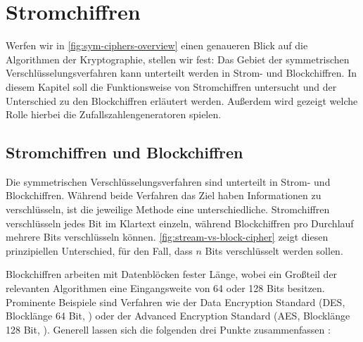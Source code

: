 \chapter{Stromchiffren}



\noindent
Werfen wir in \autoref{fig:sym-ciphers-overview} einen genaueren Blick auf die Algorithmen
der Kryptographie, stellen wir fest: Das Gebiet
der symmetrischen Verschlüsselungsverfahren kann unterteilt werden in Strom- und Blockchiffren.
In diesem Kapitel soll die Funktionsweise von Stromchiffren untersucht und der Unterschied zu
den Blockchiffren erläutert werden. Außerdem wird gezeigt welche
Rolle hierbei die Zufallszahlengeneratoren spielen.

\section{Stromchiffren und Blockchiffren}
Die symmetrischen Verschlüsselungsverfahren sind unterteilt in Strom- und Blockchiffren.
Während beide Verfahren das Ziel haben Informationen zu verschlüsseln, ist die jeweilige
Methode eine unterschiedliche. Stromchiffren verschlüsseln jedes Bit im Klartext einzeln,
während Blockchiffren pro Durchlauf mehrere Bits verschlüsseln können.
\autoref{fig:stream-vs-block-cipher} zeigt diesen prinzipiellen Unterschied, für den Fall, dass
$n$ Bits verschlüsselt werden sollen.



\noindent
Blockchiffren arbeiten mit Datenblöcken fester Länge, wobei ein Großteil der
relevanten Algorithmen eine Eingangsweite von 64 oder 128 Bits besitzen.
Prominente Beispiele sind Verfahren wie der Data Encryption Standard
(DES, Blocklänge 64 Bit, \cite[55-58]{BOOK:crypto}) oder der Advanced Encryption Standard
(AES, Blocklänge 128 Bit, \cite[87-90]{BOOK:crypto}).
Generell lassen sich die folgenden drei Punkte zusammenfassen \parencite[31]{BOOK:crypto}:


